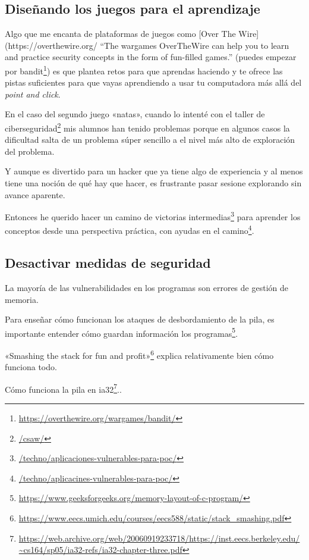 \documentclass[
  12,
]{scrartcl}
\DeclareRobustCommand{\href}[2]{#2\footnote{\url{#1}}}
\begin{document}
\hypertarget{diseuxf1ando-los-juegos-para-el-aprendizaje-1}{%
\subsection{Diseñando los juegos para el
aprendizaje}\label{diseuxf1ando-los-juegos-para-el-aprendizaje-1}}

Algo que me encanta de plataformas de juegos como {[}Over The
Wire{]}(https://overthewire.org/ ``The wargames OverTheWire can help you
to learn and practice security concepts in the form of fun-filled
games.'' (puedes empezar por
\href{https://overthewire.org/wargames/bandit/}{bandit}) es que plantea
retos para que aprendas haciendo y te ofrece las pistas suficientes para
que vayas aprendiendo a usar tu computadora más allá del \emph{point and
click}.

En el caso del segundo juego «natas», cuando lo intenté con el
\href{/csaw/}{taller de ciberseguridad} mis alumnos han tenido problemas
porque en algunos casos la dificultad salta de un problema súper
sencillo a el nivel más alto de exploración del problema.

Y aunque es divertido para un hacker que ya tiene algo de experiencia y
al menos tiene una noción de qué hay que hacer, es frustrante pasar
sesione explorando sin avance aparente.

Entonces he querido
\href{/techno/aplicaciones-vulnerables-para-poc/}{hacer un camino de
victorias intermedias} para aprender los conceptos desde una perspectiva
práctica, \href{/techno/aplicacines-vulnerables-para-poc/}{con ayudas en
el camino}.

\hypertarget{desactivar-medidas-de-seguridad}{%
\subsection{Desactivar medidas de
seguridad}\label{desactivar-medidas-de-seguridad}}

La mayoría de las vulnerabilidades en los programas son errores de
gestión de memoria.

Para enseñar cómo funcionan los ataques de desbordamiento de la pila, es
importante entender
\href{https://www.geeksforgeeks.org/memory-layout-of-c-program/}{cómo
guardan información los programas}.

\href{https://www.eecs.umich.edu/courses/eecs588/static/stack_smashing.pdf}{«Smashing
the stack for fun and profit»} explica relativamente bien cómo funciona
todo.

\href{https://web.archive.org/web/20060919233718/https://inst.eecs.berkeley.edu/~cs164/sp05/ia32-refs/ia32-chapter-three.pdf}{Cómo
funciona la pila en ia32}..
\end{document}
